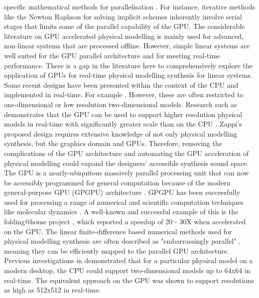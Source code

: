 \documentclass[sigconf]{nimeart}
\begin{document}
specific mathematical methods for parallelisation \cite{Bilbao2013Large}. For instance, iterative methods like the Newton Raphson \cite{Bilbao2014Modular} for solving implicit schemes inherently involve serial stages that limits some of the parallel capability of the GPU. The considerable literature on GPU accelerated physical modelling is mainly used for advanced, non-linear systems that are processed offline. However, simple linear systems are well suited for the GPU parallel architecture and for meeting real-time performance. There is a gap in the literature here to comprehensively explore the application of GPUs for real-time physical modelling synthesis for linear systems. Some recent designs have been presented within the context of the CPU and implemented in real-time. For example \cite{Willemsen2021physical,Willemsen2020Real,Willemsen2019Real,Onofrei2021Real,Willemsen2019Real,Thibault2019Wind}. However, these are often restricted to one-dimensional or low resolution two-dimensional models. Research such as \cite{Zappi2017Shader} demonstrates that the GPU can be used to support higher resolution physical models in real-time with significantly greater scale than on the CPU \cite{zappi2019Drumhead}. Zappi's proposed design requires extensive knowledge of not only physical modelling synthesis, but the graphics domain and GPUs. Therefore, removing the complications of the GPU architecture and automating the GPU acceleration of physical modelling could expand the designers' accessible synthesis sound space. The GPU is a nearly-ubiquitous massively parallel processing unit that can now be accessibly programmed for general computation because of the modern general-purpose GPU (GPGPU) architecture \cite{Blythe2008Rise}. GPGPU has been successfully used for processing a range of numerical and scientific computation techniques like molecular dynamics \cite{Rapaport2020GPU}. A well-known and successful example of this is the folding@home project \cite{Desell2010Accelerating}, which reported a speedup of 20 - 30X when accelerated on the GPU. The linear finite-difference based numerical methods used for physical modelling synthesis are often described as "embarrassingly parallel" \cite{Ilgner2013comparative}, meaning they can be efficiently mapped to the parallel GPU architecture. Previous investigations in \cite{Renney2019OpenCL} demonstrated that for a particular physical model on a modern desktop, the CPU could support two-dimensional models up to 64x64 in real-time. The equivalent approach on the GPU was shown to support resolutions as high as 512x512 in real-time.
\end{document}
